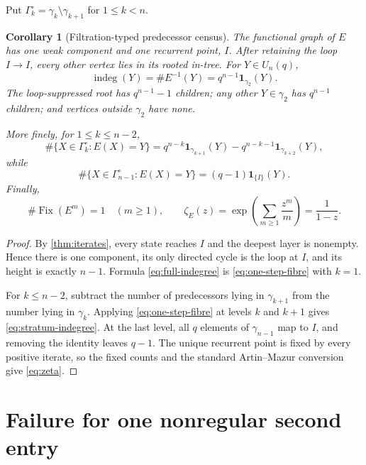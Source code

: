 \documentclass[10pt,a4paper]{amsart}
\newtheorem{corollary}[theorem]{Corollary}
\theoremstyle{definition}
\theoremstyle{remark}
\newcommand{\Fix}{\operatorname{Fix}}
\newcommand{\indeg}{\operatorname{indeg}}
\newcommand{\one}{\mathbf 1}
\begin{document}
Put $\Gamma_k^\circ=\gamma_k\setminus\gamma_{k+1}$ for $1\le k<n$.

\begin{corollary}[Filtration-typed predecessor census]
\label{cor:tree}
The functional graph of $E$ has one weak component and one recurrent point,
$I$.  After retaining the loop $I\to I$, every other vertex lies in its
rooted in-tree.  For $Y\in U_n(q)$,
\begin{equation}
 \indeg(Y)=\#E^{-1}(Y)
  =q^{n-1}\one_{\gamma_2}(Y).
 \label{eq:full-indegree}
\end{equation}
The loop-suppressed root has $q^{n-1}-1$ children; any other
$Y\in\gamma_2$ has $q^{n-1}$ children; and vertices outside $\gamma_2$
have none.

More finely, for $1\le k\le n-2$,
\begin{equation}
 \#\{X\in\Gamma_k^\circ:E(X)=Y\}
 =q^{n-k}\one_{\gamma_{k+1}}(Y)
  -q^{n-k-1}\one_{\gamma_{k+2}}(Y),
 \label{eq:stratum-indegree}
\end{equation}
while
\begin{equation}
 \#\{X\in\Gamma_{n-1}^\circ:E(X)=Y\}
 =(q-1)\one_{\{I\}}(Y).
 \label{eq:last-stratum}
\end{equation}
Finally,
\begin{equation}
 \#\Fix(E^m)=1\quad(m\ge1),\qquad
 \zeta_E(z)=\exp\!\left(\sum_{m\ge1}\frac{z^m}{m}\right)
            =\frac1{1-z}.
 \label{eq:zeta}
\end{equation}
\end{corollary}

\begin{proof}
By \cref{thm:iterates}, every state reaches $I$ and the deepest layer is
nonempty.  Hence there is one component, its only directed cycle is the
loop at $I$, and its height is exactly $n-1$.  Formula
\eqref{eq:full-indegree} is \cref{eq:one-step-fibre} with $k=1$.

For $k\le n-2$, subtract the number of predecessors lying in
$\gamma_{k+1}$ from the number lying in $\gamma_k$.  Applying
\cref{eq:one-step-fibre} at levels $k$ and $k+1$ gives
\eqref{eq:stratum-indegree}.  At the last level, all $q$ elements of
$\gamma_{n-1}$ map to $I$, and removing the identity leaves $q-1$.
The unique recurrent point is fixed by every positive iterate, so the fixed
counts and the standard Artin--Mazur conversion
\cite{ArtinMazur1965} give \eqref{eq:zeta}.
\end{proof}

\section{Failure for one nonregular second entry}
\label{sec:counterexample}
\end{document}
